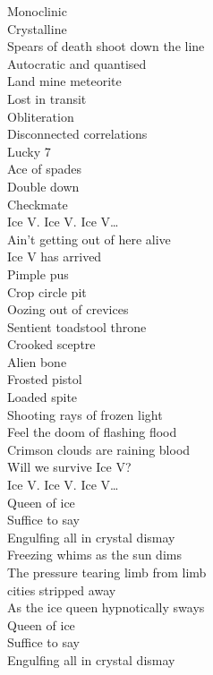 Monoclinic \\
Crystalline \\
Spears of death shoot down the line \\
Autocratic and quantised \\
Land mine meteorite \\
Lost in transit \\
Obliteration \\
Disconnected correlations \\
Lucky 7 \\
Ace of spades \\
Double down \\
Checkmate \\

Ice V. Ice V. Ice V… \\

Ain't getting out of here alive \\
Ice V has arrived \\

Pimple pus \\
Crop circle pit \\
Oozing out of crevices \\
Sentient toadstool throne \\
Crooked sceptre \\
Alien bone \\
Frosted pistol \\
Loaded spite \\
Shooting rays of frozen light \\
Feel the doom of flashing flood \\
Crimson clouds are raining blood \\

Will we survive Ice V? \\

Ice V. Ice V. Ice V… \\

Queen of ice \\
Suffice to say \\
Engulfing all in crystal dismay \\
Freezing whims as the sun dims \\
The pressure tearing limb from limb \\
 cities stripped away \\
As the ice queen hypnotically sways \\
Queen of ice \\
Suffice to say \\
Engulfing all in crystal dismay \\

